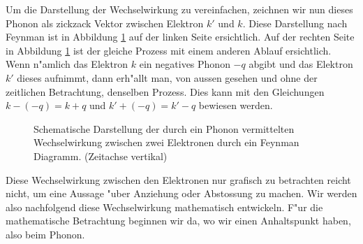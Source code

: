 \begin{refsection}
Um die Darstellung der Wechselwirkung zu vereinfachen, zeichnen wir nun dieses Phonon
als zickzack Vektor zwischen Elektron $k'$ und $k$. Diese Darstellung nach Feynman
ist in Abbildung \ref{supraleitung:FeynmanDiagram1} auf der linken Seite ersichtlich.
Auf der rechten Seite in Abbildung \ref{supraleitung:FeynmanDiagram1} ist der gleiche Prozess mit
einem anderen Ablauf ersichtlich. Wenn n"amlich das Elektron $k$ ein negatives Phonon $-q$ abgibt
und das Elektron $k'$ dieses aufnimmt, dann erh"allt man, von aussen gesehen und ohne der zeitlichen
Betrachtung, denselben Prozess. Dies kann mit den Gleichungen $k-(-q) = k + q$
und $k' +(-q) = k' - q$ bewiesen werden.

\begin{figure} %
\centering

\caption{Schematische Darstellung der durch ein Phonon vermittelten
Wechselwirkung zwischen zwei Elektronen durch ein Feynman Diagramm.
\cite{supraleitung:feynman}
(Zeitachse vertikal)
\label{supraleitung:FeynmanDiagram1}}
\end{figure}

Diese Wechselwirkung zwischen den Elektronen nur grafisch zu betrachten reicht nicht,
um eine Aussage "uber Anziehung oder Abstossung zu machen.
Wir werden also nachfolgend diese Wechselwirkung mathematisch entwickeln.
F"ur die mathematische Betrachtung beginnen wir da, wo wir einen Anhaltspunkt haben, also beim Phonon.


\end{refsection}
